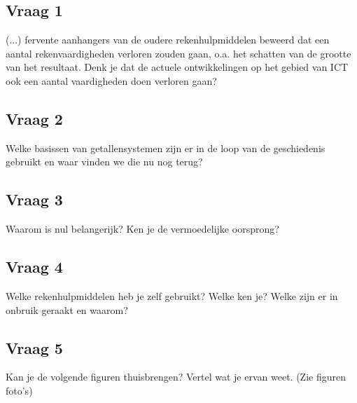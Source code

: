 \documentclass[../main.tex]{subfiles}
\begin{document}
\subsection{Vraag 1}
\begin{question}(...) fervente aanhangers van de oudere rekenhulpmiddelen beweerd dat een aantal rekenvaardigheden verloren zouden gaan, o.a. het schatten van de grootte van het resultaat. Denk je dat de actuele ontwikkelingen op het gebied van ICT ook een aantal vaardigheden doen verloren gaan?
\end{question}

\subsection{Vraag 2}
\begin{question}
Welke basissen van getallensystemen zijn er in de loop van de geschiedenis gebruikt en waar vinden we die nu nog terug?
\end{question}

\subsection{Vraag 3}
\begin{question}
Waarom is nul belangerijk? Ken je de vermoedelijke oorsprong?
\end{question}

\subsection{Vraag 4}
\begin{question}
Welke rekenhulpmiddelen heb je zelf gebruikt? Welke ken je? Welke zijn er in onbruik geraakt en waarom?
\end{question}

\subsection{Vraag 5}
\begin{question}
Kan je de volgende figuren thuisbrengen? Vertel wat je ervan weet. (Zie figuren foto’s)
\end{question}
\end{document}
